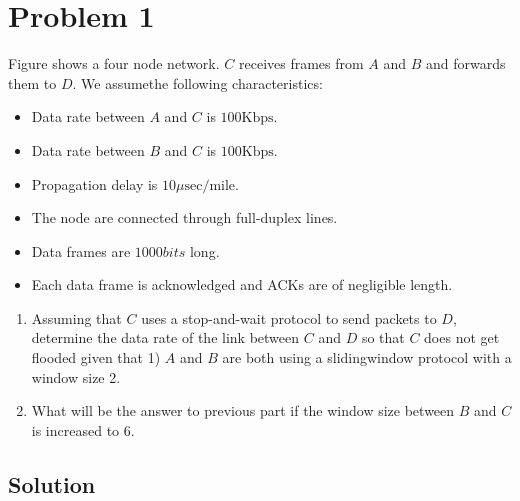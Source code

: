 
\section*{Problem 1}

\begin{figure}[H]
    \centering
\end{figure}

Figure shows a four node network.
$C$ receives frames from $A$ and $B$ and forwards them to $D$.
We assumethe following characteristics:

\begin{itemize}
    \item Data rate between $A$ and $C$ is $100 \text{Kbps}$.
    \item Data rate between $B$ and $C$ is $100 \text{Kbps}$.
    \item Propagation delay is $10\mu \text{sec/mile}$.
    \item The node are connected through full-duplex lines.
    \item Data frames are $1000 bits$ long.
    \item Each data frame is acknowledged and ACKs are of negligible length.
\end{itemize}

\begin{enumerate}
    \item Assuming that $C$ uses a stop-and-wait protocol to send packets to $D$, determine the data rate of the link between $C$ and $D$ so that $C$ does not get flooded given that 1) $A$ and $B$ are both using a slidingwindow protocol with a window size 2.

    \item What will be the answer to previous part if the window size between $B$ and $C$ is increased to 6.
\end{enumerate}
\subsection*{Solution}

